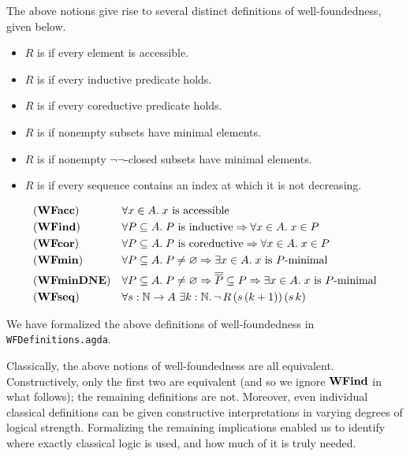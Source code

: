 The above notions give rise to several distinct definitions of well-foundedness, given below.

\begin{definition} \label{def:WFproperties} \hfill
  \begin{itemize}
    \item $R$ is  if every element is accessible.
    \item $R$ is  if every inductive predicate holds.
    \item $R$ is  if every coreductive predicate holds.
    \item $R$ is  if nonempty subsets have minimal elements.
    \item $R$ is  if nonempty $\lnot \lnot$-closed subsets have minimal elements.
    \item $R$ is  if every sequence contains an index at which it is not decreasing.
  \end{itemize}
      \begin{align*}
        &(\mathbf{WFacc})  &&\forall x \in A.\; x \text{ is accessible} \\
        &(\mathbf{WFind}) &&\forall P \subseteq A.\;\text{$P$ is inductive} \Rightarrow \forall x \in A.\; x \in P\\
        &(\mathbf{WFcor}) &&\forall P \subseteq A.\;\text{$P$ is coreductive} \Rightarrow \forall x \in A.\; x \in P\\
        &(\mathbf{WFmin})  &&\forall P \subseteq A.\; P \neq \varnothing \Rightarrow
        \exists x \in A.\; \text{$x$ is $P$-minimal}\\
        &(\mathbf{WFminDNE}) &&\forall P \subseteq A.\; P \neq \varnothing \Rightarrow \overline{\overline{P}} \subseteq P \Rightarrow
        \exists x \in A.\; \text{$x$ is $P$-minimal}\\
        &(\mathbf{WFseq}) &&\forall s : \mathbb{N} \to A\ \exists k : \mathbb{N}.\, \lnot \, R \,(s\,(k+1))\,(s\,k)
      \end{align*}
\end{definition}
We have formalized the above definitions of well-foundedness in \texttt{WFDefinitions.agda}.

Classically, the above notions of well-foundedness are all equivalent.  Constructively, only the first two are equivalent (and so we ignore $\mathbf{WFind}$ in what follows); the remaining definitions are not. Moreover, even individual classical definitions can be given constructive
interpretations in varying degrees of logical strength.
Formalizing the remaining implications enabled us to identify where exactly classical logic
is used, and how much of it is truly needed.

